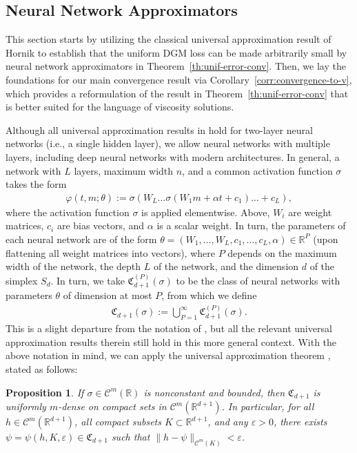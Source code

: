 \documentclass[11pt,reqno]{amsart}
\numberwithin{equation}{section}
\theoremstyle{plain}
\newtheorem{proposition}[theorem]{Proposition}
\newcommand{\R}{\mathbb{R}}
\newcommand{\sC}{\mathcal{C}}
\begin{document}
\subsection{Neural Network Approximators}
\label{sec:nn-approximators} 
This section starts by utilizing the classical universal approximation result of Hornik \cite{univ-approx-thm} to establish that the uniform DGM loss can be made arbitrarily small by neural network approximators in Theorem~\ref{th:unif-error-conv}. Then, we lay the foundations for our main convergence result via Corollary~\ref{corr:convergence-to-v}, which provides a reformulation of the result in Theorem~\ref{th:unif-error-conv} that is better suited for the language of viscosity solutions. 

Although all universal approximation results in \cite{univ-approx-thm} hold for two-layer neural networks (i.e., a single hidden layer), we allow neural networks with multiple layers, including deep neural networks with modern architectures. In general, a network with $L$ layers, maximum width $n$, and a common activation function $\sigma$ takes the form
\begin{align}
\label{eq:multi-layer-nn}
    \varphi(t, m; \theta) := \sigma(W_{L} \ldots \sigma(W_1 m + \alpha t + c_1) \ldots + c_{L}),
\end{align}
where the activation function $\sigma$ is applied elementwise. Above, $W_i$ are weight matrices, $c_i$ are bias vectors, and $\alpha$ is a scalar weight. In turn, the parameters of each neural network are of the form $\theta = (W_1, \ldots, W_L, c_1, \ldots, c_L, \alpha) \in \R^P$ (upon flattening all weight matrices into vectors), where $P$ depends on the maximum width of the network, the depth $L$ of the network, and the dimension $d$ of the simplex $S_d$. In turn, we take $\mathfrak{C}^{(P)}_{d+1}(\sigma)$ to be the class of neural networks with parameters $\theta$ of dimension at most $P$, from which we define
\begin{align*}
    \mathfrak{C}_{d+1}(\sigma) := \bigcup_{P=1}^\infty \mathfrak{C}^{(P)}_{d+1}(\sigma).
\end{align*}
This is a slight departure from the notation of \cite{univ-approx-thm}, but all the relevant universal approximation results therein still hold in this more general context.
With the above notation in mind, we can apply the universal approximation theorem \cite[Theorem 3]{univ-approx-thm}, stated as follows:
\begin{proposition}
\label{th:univ-approx}
If $\sigma \in \sC^m(\R)$ is nonconstant and bounded, then $\mathfrak{C}_{d+1}$ is uniformly $m$-dense on compact sets in $\sC^m(\R^{d+1})$. In particular, for all $h \in \sC^m(\R^{d+1})$, all compact subsets $K \subset \R^{d+1}$, and any $\varepsilon > 0$, there exists $\psi = \psi(h, K, \varepsilon) \in \mathfrak{C}_{d+1}$ such that $\|h - \psi\|_{\sC^m(K)} < \varepsilon$.
\end{proposition}
\end{document}
